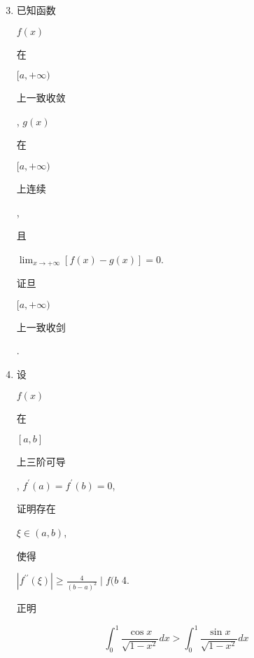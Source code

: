 \documentclass[10pt]{article}
\begin{document}
\begin{enumerate}
  \setcounter{enumi}{2}
  \item \begin{CJK}{UTF8}{mj}已知函数\end{CJK} $f(x)$ \begin{CJK}{UTF8}{mj}在\end{CJK} $[a,+\infty)$ \begin{CJK}{UTF8}{mj}上一致收敛\end{CJK} , $g(x)$ \begin{CJK}{UTF8}{mj}在\end{CJK} $[a,+\infty)$ \begin{CJK}{UTF8}{mj}上连续\end{CJK}, \begin{CJK}{UTF8}{mj}且\end{CJK} $\lim _{x \rightarrow+\infty}[f(x)-g(x)]=0$. \begin{CJK}{UTF8}{mj}证旦\end{CJK} $[a,+\infty)$ \begin{CJK}{UTF8}{mj}上一致收剑\end{CJK}.

  \item \begin{CJK}{UTF8}{mj}设\end{CJK} $f(x)$ \begin{CJK}{UTF8}{mj}在\end{CJK} $[a, b]$ \begin{CJK}{UTF8}{mj}上三阶可导\end{CJK}, $f^{\prime}(a)=f^{\prime}(b)=0$, \begin{CJK}{UTF8}{mj}证明存在\end{CJK} $\xi \in(a, b)$, \begin{CJK}{UTF8}{mj}使得\end{CJK} $\left|f^{\prime \prime}(\xi)\right| \geq \frac{4}{(b-a)^{2}} \mid f(b$ 4. \begin{CJK}{UTF8}{mj}正明\end{CJK}

\end{enumerate}
$$
\int_{0}^{1} \frac{\cos x}{\sqrt{1-x^{2}}} d x>\int_{0}^{1} \frac{\sin x}{\sqrt{1-x^{2}}} d x
$$
\end{document}
